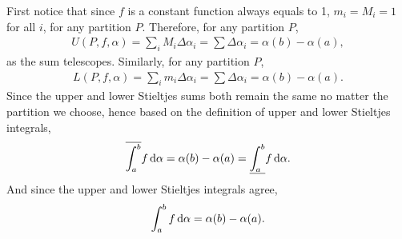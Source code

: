 \documentclass[12pt]{article}
\begin{document}
\begin{fproof}[1]
  First notice that since \(f\) is a constant function always equals to 1, \(m_i = M_i = 1\) for all \(i\), for any partition \(P\).
  Therefore, for any partition \(P\),
  \begin{align*}
    U(P,f, \alpha) = \sum_i M_i \Delta \alpha_i = \sum \Delta \alpha_i = \alpha(b) - \alpha(a),
  \end{align*}
  as the sum telescopes.
  Similarly, for any partition \(P\),
  \begin{align*}
    L(P,f, \alpha) = \sum_i m_i \Delta \alpha_i = \sum \Delta \alpha_i = \alpha(b) - \alpha(a).
  \end{align*}
  Since the upper and lower Stieltjes sums both remain the same no matter the partition we choose, hence based on the definition of upper and lower Stieltjes integrals,
  \begin{align*}
    \overline{\int_{a}^{b}} f \mathop{}\!\mathrm{d}\alpha = \alpha(b) - \alpha(a) = \underline{\int_{a}^{b}} f \mathop{}\!\mathrm{d}\alpha.
  \end{align*} 
  And since the upper and lower Stieltjes integrals agree, 
  \begin{align*}
    \int_{a}^{b} f \mathop{}\!\mathrm{d}\alpha = \alpha(b) - \alpha(a).
  \end{align*}
\end{fproof}

\newpage
\end{document}
